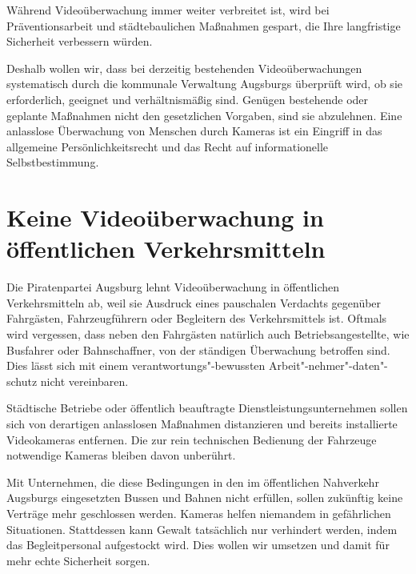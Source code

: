   Während Videoüberwachung immer weiter verbreitet ist, wird bei 
  Präventionsarbeit und städtebaulichen Maßnahmen gespart, die Ihre 
  langfristige Sicherheit verbessern würden.
  
  Deshalb wollen wir, dass bei derzeitig bestehenden Videoüberwachungen 
  systematisch durch die kommunale Verwaltung Augsburgs überprüft wird, ob sie 
  erforderlich, geeignet und verhältnismäßig sind. Genügen bestehende oder 
  geplante Maßnahmen nicht den gesetzlichen Vorgaben, sind sie abzulehnen. 
  Eine anlasslose Überwachung von Menschen durch Kameras ist ein Eingriff in 
  das allgemeine Persönlichkeitsrecht und das Recht auf informationelle 
  Selbstbestimmung. 
  
  \section{Keine Videoüberwachung in öffentlichen Verkehrsmitteln}
  
  Die Piratenpartei Augsburg lehnt Videoüberwachung in öffentlichen 
  Verkehrsmitteln ab, weil sie Ausdruck eines pauschalen Verdachts gegenüber 
  Fahrgästen, Fahrzeugführern oder Begleitern des Verkehrsmittels ist. Oftmals 
  wird vergessen, dass neben den Fahrgästen natürlich auch Betriebsangestellte,
  wie Busfahrer oder Bahnschaffner, von der ständigen Überwachung betroffen 
  sind. Dies lässt sich mit einem verantwortungs"-bewussten 
  Arbeit"-nehmer"-daten"-schutz nicht vereinbaren.
  
  Städtische Betriebe oder öffentlich beauftragte Dienstleistungsunternehmen 
  sollen sich von derartigen anlasslosen Maßnahmen distanzieren und bereits 
  installierte Videokameras entfernen. Die zur rein technischen Bedienung der 
  Fahrzeuge notwendige Kameras bleiben davon unberührt.
  
  Mit Unternehmen, die diese Bedingungen in den im öffentlichen Nahverkehr 
  Augsburgs eingesetzten Bussen und Bahnen nicht erfüllen, sollen zukünftig 
  keine Verträge mehr geschlossen werden. Kameras helfen niemandem in 
  gefährlichen Situationen. Stattdessen kann Gewalt tatsächlich nur verhindert 
  werden, indem das Begleitpersonal aufgestockt wird. Dies wollen wir umsetzen 
  und damit für mehr echte Sicherheit sorgen.
